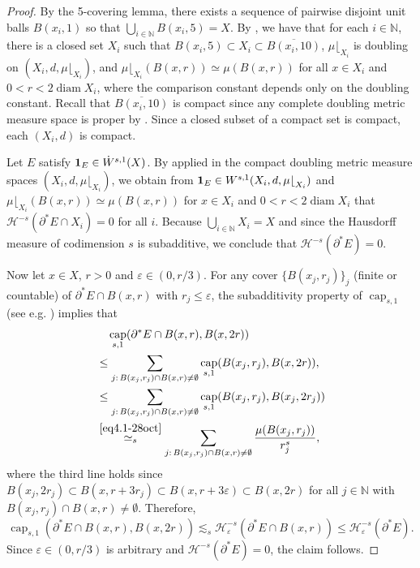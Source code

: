 \documentclass[11pt,leqno]{amsart}
\numberwithin{equation}{section}
\theoremstyle{definition}
\DeclareMathOperator{\capp}{cap}
\newcommand{\caps}{\capp_{s,1}}
\DeclareMathOperator{\diam}{diam}
\begin{document}
	\begin{proof}
		By the 5-covering lemma, there exists a sequence of pairwise disjoint unit balls $B(x_i,1)$ so that  $\bigcup_{i\in\mathbb N} B(x_i,5)=X$.
		By \cite[Lemma 7.1]{BB23}, we have that for each $i\in\mathbb N$, there is a closed
		set $X_i$ such that $B(x_i,5)\subset X_i\subset \overline{B(x_i,10)}$,  $\mu{\lfloor}_{X_i}$ is doubling on $(X_i, d,\mu{\lfloor}_{X_i})$,
		and 
		{$\mu{\lfloor}_{X_i}(B(x,r))\simeq \mu(B(x,r))$}
		for all $x\in X_i$ 
		and
		$0<r<2\diam X_i$, where the comparison constant depends only on the doubling constant.
		Recall that $\overline{B(x_i,10)}$ is compact since any complete doubling metric measure space is proper by \cite[Lemma 4.1.14]{HKST15}.
		Since a closed subset of a compact set is compact,
		each $(X_i,d)$ is compact.
		
		Let $E$ satisfy ${\bf 1}_E\in \dot W^{s,1}(X)$.
		By \cite[Theorem 1.2]{Kl25} applied in the compact doubling metric measure spaces $({X_i},d,\mu{\lfloor}_{{X_i}})$, we obtain from ${\bf 1}_E\in  W^{s,1}(X_i, d, \mu{\lfloor}_{X_i})$ and $\mu{\lfloor}_{X_i}(B(x,r))\simeq\mu(B(x,r))$ for $x\in X_i$ and $0<r<2\diam X_i$ that $\mathcal{H}^{-s}(\partial^* E\cap X_i)=0$ for all $i$.
		Because $\bigcup_{i\in\mathbb N}{X_i}=X$ and since the Hausdorff measure of codimension $s$ is subadditive, we conclude that $\mathcal H^{-s}(\partial^*E)=0$.
		
		Now let $x\in X$, $r>0$ and $\varepsilon\in (0,r/3)$. For any cover $\{B(x_j, r_j)\}_{j}$
		(finite or countable)
		of $\partial^*E\cap B(x,r)$ with $r_j\leq \varepsilon$, the subadditivity property of
		$\caps$ (see e.g. \cite[Proposition 3.4]{BB23}) implies that
		\begin{align*}
			&\quad \caps(\partial^*E\cap B(x,r), B(x,2r))\\
			&\leq   \sum_{j:\, B(x_j,r_j)\cap B(x,r)\neq\emptyset} \caps(B(x_j,r_j), B(x,2r)), \\
			&\leq  \sum_{j:\, B(x_j,r_j)\cap B(x,r)\neq\emptyset} \caps(B(x_j,r_j), B(x_j,2r_j))\\
			&\overset{\eqref{eq4.1-28oct}}{\simeq_s} \sum_{j:\, B(x_j,r_j)\cap B(x,r)\neq\emptyset} \frac{\mu(B(x_j,r_j))}{r_j^s},
		\end{align*}
		where the third line holds since $B(x_j,2r_j)\subset B(x, r+ 3r_j) \subset B(x, r+3\varepsilon) \subset B(x,2r)$ for all $j\in\mathbb N$ with $B(x_j,r_j)\cap B(x,r)\neq\emptyset$.
		Therefore,
		\[
		\caps(\partial^*E\cap B(x,r), B(x,2r))\lesssim_s \mathcal H_\varepsilon^{-s}(\partial^* E\cap B(x,r))\leq \mathcal H_\varepsilon^{-s}(\partial^* E).
		\]
		Since $\varepsilon\in (0,r/3)$ is arbitrary and $\mathcal H^{-s}(\partial^*E)=0$, the claim follows.
	\end{proof}
	
\end{document}
